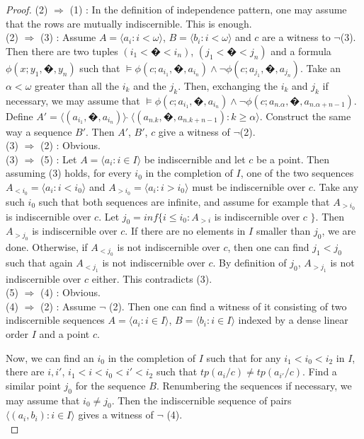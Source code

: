 \documentclass[english]{article}
\theoremstyle{definition}
\theoremstyle{mystyle}
\theoremstyle{remark}
\begin{document}
\begin{proof}
(2) $\Rightarrow$ (1) : In the definition of independence pattern, one may assume that the rows are mutually indiscernible. This is enough.
\\

(2) $\Rightarrow$ (3) : Assume $A=\langle a_i : i< \omega\rangle$, $B=\langle b_i : i<\omega\rangle$ and $c$ are a witness to $\neg$(3). Then there are two tuples $(i_1 < � < i_n)$, $(j_1 < � < j_n)$ and a formula $\phi(x;y_1,�,y_n)$ such that $\models \phi(c;a_{i_1},�,a_{i_n}) \wedge \neg \phi(c;a_{j_1},�,a_{j_n})$. Take an $\alpha < \omega$ greater than all the $i_k$ and the $j_k$. Then, exchanging the $i_k$ and $j_k$ if necessary, we may assume that $\models \phi(c;a_{i_1},�,a_{i_n}) \wedge \neg \phi(c;a_{n.\alpha},�,a_{n.\alpha+n-1})$. Define $A'=\langle (a_{i_1},�,a_{i_n}) \rangle ~\hat{ }~\langle (a_{n.k},�,a_{n.k+n-1}) : k \geq \alpha \rangle$. Construct the same way a sequence $B'$. Then $A'$, $B'$, $c$ give a witness of $\neg$(2).
\\

(3) $\Rightarrow$ (2) : Obvious.
\\

(3) $\Rightarrow$ (5) : Let $A=\langle a_i : i \in I\rangle$ be indiscernible and let $c$ be a point. Then assuming (3) holds, for every $i_0$ in the completion of $I$, one of the two sequences $A_{<i_0} = \langle a_i : i<i_0\rangle$ and $A_{>i_0}=\langle a_i : i>i_0\rangle$ must be indiscernible over $c$. Take any such $i_0$ such that both sequences are infinite, and assume for example that $A_{>i_0}$ is indiscernible over $c$. Let $j_0 = inf\{i \leq i_0 : A_{>i}$ is indiscernible over $c$ $\}$. Then $A_{>j_0}$ is indiscernible over $c$. If there are no elements in $I$ smaller than $j_0$, we are done. Otherwise, if $A_{<j_0}$ is not indiscernible over $c$, then one can find $j_1 < j_0$ such that again $A_{<j_1}$ is not indiscernible over $c$. By definition of $j_0$, $A_{>j_1}$ is not indiscernible over $c$ either. This contradicts (3).
\\

(5) $\Rightarrow$ (4) : Obvious.
\\

(4) $\Rightarrow$ (2) : Assume $\neg$ (2). Then one can find a witness of it consisting of two indiscernible sequences $A=\langle a_i : i\in I\rangle$, $B=\langle b_i : i\in I\rangle$ indexed by a dense linear order $I$ and a point $c$.

Now, we can find an $i_0$ in the completion of $I$ such that for any $i_1 < i_0 < i_2$ in $I$, there are $i, i'$, $i_1 < i < i_0 < i' < i_2$ such that 
$tp(a_i/c) \neq tp(a_{i'}/c)$.
Find a similar point $j_0$ for the sequence $B$. Renumbering the sequences if necessary, we may assume that $i_0 \neq j_0$. Then the indiscernible sequence of pairs $\langle(a_i,b_i) : i \in I \rangle$ gives a witness of $\neg$ (4).
\\


\end{proof}
\end{document}
